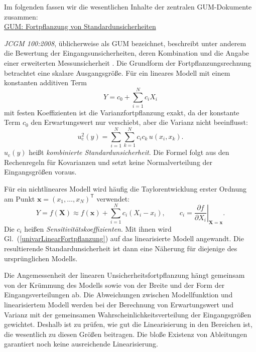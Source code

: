 Im folgenden fassen wir die wesentlichen Inhalte der zentralen GUM-Dokumente zusammen:\\

\underline{GUM: Fortpflanzung von Standardunsicherheiten}

\textsl{JCGM 100:2008}, üblicherweise als GUM bezeichnet, beschreibt unter
anderem die Bewertung der Eingangsunsicherheiten, deren Kombination und die
Angabe einer erweiterten Messunsicherheit \cite{GUM95}.
Die Grundform der Fortpflanzungsrechnung betrachtet eine skalare Ausgangsgröße.
Für ein lineares Modell mit einem konstanten additiven Term
\begin{equation}
Y=c_0+\sum_{i=1}^N c_iX_i
\label{univarLinear}
\end{equation}
mit festen Koeffizienten ist die Varianzfortpflanzung exakt, da der konstante Term $c_0$ den Erwartungswert nur verschiebt, aber die Varianz nicht beeinflusst:
\begin{equation}
u_{\mathrm c}^2(y)=\sum_{i=1}^N\sum_{k=1}^N c_i c_k\,u(x_i,x_k).
\label{univarLinearFortpflanzung}
\end{equation}
$u_{\mathrm c}(y)$ heißt \textsl{kombinierte Standardunsicherheit}.
Die Formel folgt aus den Rechenregeln für Kovarianzen und setzt keine
Normalverteilung der Eingangsgrößen voraus.

Für ein nichtlineares Modell wird häufig die Taylorentwicklung erster Ordnung
am Punkt $\mathbf x=(x_1,\dots,x_N)^\mathsf T$ verwendet:
\begin{equation}
Y=f(\mathbf X)\approx f(\mathbf x)+
\sum_{i=1}^N c_i(X_i-x_i),\qquad
c_i=\left.\frac{\partial f}{\partial X_i}\right|_{\mathbf X=\mathbf x}.
\label{univarTaylorLin}
\end{equation}
Die $c_i$ heißen \textsl{Sensitivitätskoeffizienten}. Mit ihnen wird
Gl.~(\ref{univarLinearFortpflanzung}) auf das linearisierte Modell angewandt.
Die resultierende Standardunsicherheit ist dann eine Näherung für diejenige
des ursprünglichen Modells.

Die Angemessenheit der linearen Unsicherheitsfortpflanzung hängt gemeinsam
von der Krümmung des Modells sowie von der Breite und der Form der
Eingangsverteilungen ab. Die Abweichungen zwischen Modellfunktion und
linearisiertem Modell werden bei der Berechnung von Erwartungswert und
Varianz mit der gemeinsamen Wahrscheinlichkeitsverteilung der
Eingangsgrößen gewichtet. Deshalb ist zu prüfen, wie gut die Linearisierung
in den Bereichen ist, die wesentlich zu diesen Größen beitragen.
Die bloße Existenz von Ableitungen garantiert noch keine ausreichende
Linearisierung.

